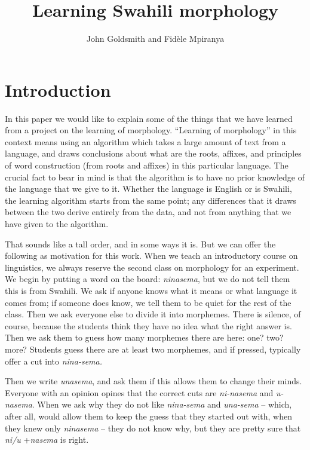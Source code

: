 \documentclass[output=paper,colorlinks,citecolor=brown]{langscibook}
\title{Learning Swahili morphology}
\author{John Goldsmith\affiliation{University of Chicago} and Fidèle Mpiranya\affiliation{University of Chicago}}
\begin{document}
\maketitle 

\section{Introduction}\label{sec:goldsmith:1}

In this paper we would like to explain some of the things that we have learned from a project on the learning of morphology. ``Learning of morphology'' in this context means using an algorithm which takes a large amount of text from a language, and draws conclusions about what are the roots, affixes, and principles of word construction (from roots and affixes) in this particular language. The crucial fact to bear in mind is that the algorithm is to have no prior knowledge of the language that we give to it. Whether the language is English or is Swahili, the learning algorithm starts from the same point; any differences that it draws between the two derive entirely from the data, and not from anything that we have given to the algorithm. 

That sounds like a tall order, and in some ways it is. But we can offer the following as motivation for this work. When we teach an introductory course on linguistics, we always reserve the second class on morphology for an experiment. We begin by putting a word on the board: \textit{ninasema}, but we do not tell them this is from Swahili. We ask if anyone knows what it means or what language it comes from; if someone does know, we tell them to be quiet for the rest of the class. Then we ask everyone else to divide it into morphemes. There is silence, of course, because the students think they have no idea what the right answer is. Then we ask them to guess how many morphemes there are here: one? two? more? Students guess there are at least two morphemes, and if pressed, typically offer a cut into \textit{nina-sema.}

Then we write \textit{unasema}, and ask them if this allows them to change their minds. Everyone with an opinion opines that the correct cuts are \textit{ni-nasema} and \textit{u-nasema}. When we ask why they do not like \textit{nina-sema} and \textit{una-sema} -- which, after all, would allow them to keep the guess that they started out with, when they knew only \textit{ninasema} -- they do not know why, but they are pretty sure that \textit{ni/u} +\textit{nasema} is right.
\end{document}

